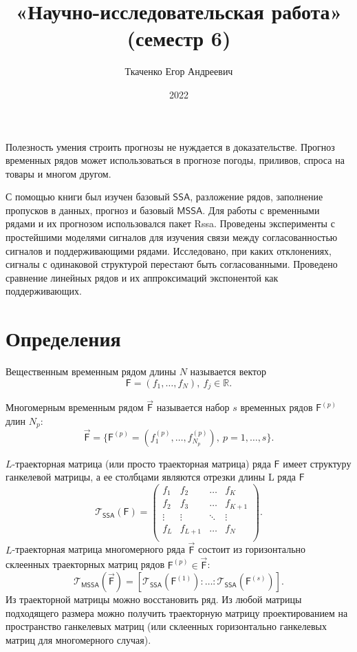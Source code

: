 \documentclass[specialist, substylefile = spbureport.rtx,
    subf,href,colorlinks=true, 12pt]{disser}
\title{«Научно-исследовательская работа» (семестр 6)}
\author{Ткаченко Егор Андреевич}
\date{2022}
\newcommand{\T}{\mathcal{T}}
\newcommand{\F}{\mathsf{F}}
\newcommand{\MF}{\vec{\F}}
\newcommand{\SSA}{\mathsf{SSA}}
\newcommand{\MSSA}{\mathsf{MSSA}}
\begin{document}
    \maketitle
    \pagebreak
    \tableofcontents
    \pagebreak

    \intro
        Полезность умения строить прогнозы не нуждается в доказательстве. Прогноз временных рядов может использоваться в прогнозе погоды, приливов, спроса на товары и многом другом.
         
        С помощью книги \cite{SSA_with_R} был изучен базовый $\SSA$, разложение рядов, заполнение пропусков в данных, прогноз и базовый $\MSSA$. Для работы с временными рядами и их прогнозом использовался пакет Rssa. Проведены эксперименты с простейшими моделями сигналов для изучения связи между согласованностью сигналов и поддерживающими рядами. 
        Исследовано, при каких отклонениях, сигналы с одинаковой структурой перестают быть согласованными. Проведено сравнение линейных рядов и их аппроксимаций экспонентой как поддерживающих.

    
    \section{Определения}
        Вещественным временным рядом длины $N$ называется вектор
        $$\F = (f_1, \dots, f_{N}),\ f_j \in \mathbb{R}.$$

        Многомерным временным рядом $\MF$ называется набор $s$ временных рядов $\F^{(p)}$ длин $N_p$:
        $$\MF = \{\F^{(p)} = (f^{(p)}_1, \dots, f^{(p)}_{N_p}),\ p=1, \dots, s\}.$$

        $L$-траекторная матрица (или просто траекторная матрица) ряда $\F$ имеет структуру ганкелевой матрицы, а ее столбцами являются отрезки длины L ряда $\F$
        $$\T_{\SSA}(\F) =
        \begin{pmatrix}
            f_1     & f_2    & \dots  & f_{K} \\
            f_2     & f_3    & \dots  & f_{K+1}     \\
            \vdots  & \vdots & \ddots & \vdots  \\
            f_{L} & f_{L+1}    & \dots  & f_{N} \\
        \end{pmatrix}.$$
        $L$-траекторная матрица многомерного ряда $\MF$ состоит из горизонтально склеенных траекторных матриц рядов $\F^{(p)} \in \MF$:
        $$\T_{\MSSA}(\MF) = [\T_{\SSA}(\F^{(1)}): \dotso :\T_{\SSA}(\F^{(s)})].$$
        Из траекторной матрицы можно восстановить ряд. Из любой матрицы подходящего размера можно получить траекторную матрицу проектированием на пространство ганкелевых матриц (или склеенных горизонтально ганкелевых матриц для многомерного случая).
\end{document}
